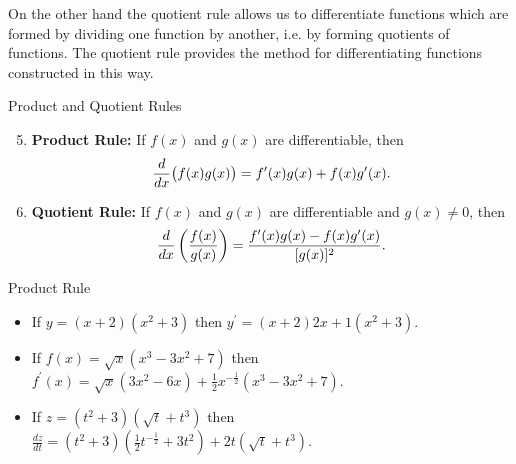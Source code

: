 On the other hand the quotient rule allows us to differentiate functions which are formed by dividing one function
by another, i.e. by forming quotients of functions. The quotient rule provides the method for differentiating functions constructed in this way.

\begin{theorem}{Product and Quotient Rules}
    \begin{enumerate}
        \setcounter{enumi}{4}
        \vspace{0.5em}
        \item \textbf{Product Rule:} If \(f(x)\) and \(g(x)\) are differentiable, then \vspace{0.5em}
        \[
        \frac{d}{dx}\big(f(x)g(x)\big)=f'(x)g(x)+f(x)g'(x). \vspace{0.5em}
        \] \vspace{0.5em}
        \item \textbf{Quotient Rule:} If \(f(x)\) and \(g(x)\) are differentiable and \(g(x)\neq0\), then
        \vspace{0.5em}
        \[
        \frac{d}{dx}\left(\frac{f(x)}{g(x)}\right)=\frac{f'(x)g(x)-f(x)g'(x)}{[g(x)]^2}. \vspace{0.5em}
        \]
    \end{enumerate}
\end{theorem}

\begin{example} Product Rule

    \begin{itemize}
        \item If \(y=(x+2)\left(x^2+3\right)\) then \(y^{\prime}=(x+2) 2 x+1\left(x^2+3\right)\). \vspace{0.5em}
        \item If \(f(x)=\sqrt{x}\left(x^3-3 x^2+7\right)\) then \(f^{\prime}(x)=\sqrt{x}\left(3 x^2-6 x\right)+\frac{1}{2} x^{-\frac{1}{2}}\left(x^3-3 x^2+7\right)\). \vspace{0.5em}
        \item If \(z=\left(t^2+3\right)\left(\sqrt{t}+t^3\right)\) then \(\frac{d z}{d t}=\left(t^2+3\right)\left(\frac{1}{2} t^{-\frac{1}{2}}+3 t^2\right)+2 t\left(\sqrt{t}+t^3\right)\). \vspace{0.5em}
    \end{itemize}

\end{example}

